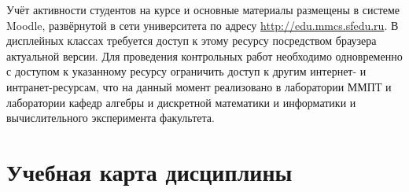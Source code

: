 
Учёт активности студентов на курсе и основные материалы размещены в системе Moodle, развёрнутой в сети университета по адресу \url{http://edu.mmcs.sfedu.ru}. В дисплейных классах требуется доступ к этому ресурсу посредством браузера актуальной версии. Для проведения контрольных работ необходимо одновременно с доступом к указанному ресурсу ограничить доступ к другим интернет- и интранет-ресурсам, что на данный момент реализовано в лаборатории ММПТ и лаборатории кафедр алгебры и дискретной математики и информатики и вычислительного эксперимента факультета.

\section{Учебная карта дисциплины}



